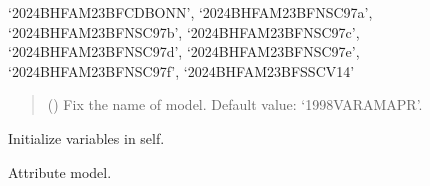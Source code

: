 \documentclass[letterpaper,10pt,english]{sphinxmanual}
\begin{document}
\begin{fulllineitems}
‘2024\sphinxhyphen{}BHF\sphinxhyphen{}AM\sphinxhyphen{}23BF\sphinxhyphen{}CDBONN’,     ‘2024\sphinxhyphen{}BHF\sphinxhyphen{}AM\sphinxhyphen{}23BF\sphinxhyphen{}NSC97a’, ‘2024\sphinxhyphen{}BHF\sphinxhyphen{}AM\sphinxhyphen{}23BF\sphinxhyphen{}NSC97b’, ‘2024\sphinxhyphen{}BHF\sphinxhyphen{}AM\sphinxhyphen{}23BF\sphinxhyphen{}NSC97c’, ‘2024\sphinxhyphen{}BHF\sphinxhyphen{}AM\sphinxhyphen{}23BF\sphinxhyphen{}NSC97d’,     ‘2024\sphinxhyphen{}BHF\sphinxhyphen{}AM\sphinxhyphen{}23BF\sphinxhyphen{}NSC97e’, ‘2024\sphinxhyphen{}BHF\sphinxhyphen{}AM\sphinxhyphen{}23BF\sphinxhyphen{}NSC97f’, ‘2024\sphinxhyphen{}BHF\sphinxhyphen{}AM\sphinxhyphen{}23BF\sphinxhyphen{}SSCV14’
\begin{quote}\begin{description}
\sphinxAtStartPar
{} (\sphinxstyleliteralemphasis{\sphinxupquote{, }}) \textendash{} Fix the name of model. Default value: ‘1998\sphinxhyphen{}VAR\sphinxhyphen{}AM\sphinxhyphen{}APR’.

\end{description}\end{quote}

\sphinxAtStartPar
{}

\begin{fulllineitems}
\label{\detokenize{source/api/setup_micro:nucleardatapy.setup_micro.SetupMicro.init_self}}
\pysigstartsignatures
{}
\pysigstopsignatures
\sphinxAtStartPar
Initialize variables in self.

\end{fulllineitems}


\begin{fulllineitems}
\label{\detokenize{source/api/setup_micro:nucleardatapy.setup_micro.SetupMicro.model}}
\pysigstartsignatures
{}
\pysigstopsignatures
\sphinxAtStartPar
Attribute model.

\end{fulllineitems}


\end{fulllineitems}
\end{document}
